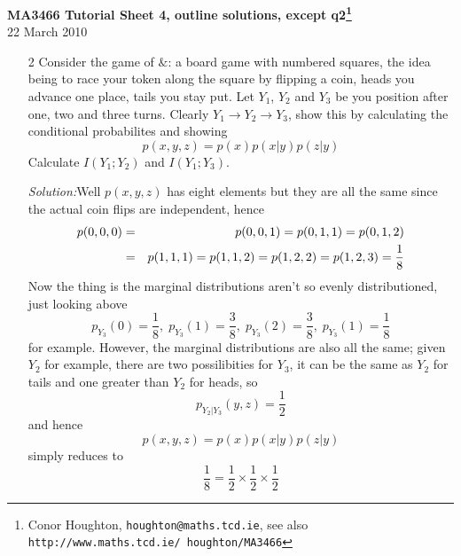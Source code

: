 \documentclass[12pt]{article}
\newcommand{\soln}{\noindent\textit{Solution:}}
\begin{document}
\begin{center}
{\bf MA3466 Tutorial Sheet 4, outline solutions, except q2\footnote{Conor Houghton, {\tt houghton@maths.tcd.ie}, see also {\tt http://www.maths.tcd.ie/ houghton/MA3466}}}\\[1cm]{} 22 March 2010
\end{center}
\begin{enumerate}

\item [2] Consider the game of $\&$\texttrademark: a board game with numbered squares, the idea being to race your token along the square by flipping a coin, heads you advance one place, tails you stay put. Let $Y_1$, $Y_2$ and $Y_3$ be you position after one, two and three turns. Clearly $Y_1\rightarrow Y_2 \rightarrow Y_3$, show this by calculating the conditional probabilites and showing
\begin{equation}
p(x,y,z)=p(x)p(x|y)p(z|y)
\end{equation}
Calculate $I(Y_1;Y_2)$ and $I(Y_1;Y_3)$.

\soln Well $p(x,y,z)$ has eight elements but they are all the same since the actual coin flips are independent, hence
\begin{eqnarray}
p(0,0,0)&=&p(0,0,1)=p(0,1,1)=p(0,1,2)\cr
&=&p(1,1,1)=p(1,1,2)=p(1,2,2)=p(1,2,3)=\frac{1}{8}
\end{eqnarray}
Now the thing is the marginal distributions aren't so evenly distributioned, just looking above
\begin{equation}
p_{Y_3}(0)=\frac{1}{8},\;
p_{Y_3}(1)=\frac{3}{8},\;
p_{Y_3}(2)=\frac{3}{8},\;
p_{Y_3}(1)=\frac{1}{8}
\end{equation}
for example. However, the marginal distributions are also all the same; given $Y_2$ for example, there are two possilibities for $Y_3$, it can be the same as $Y_2$ for tails and one greater than $Y_2$ for heads, so
\begin{equation}
p_{Y_2|Y_3}(y,z)=\frac{1}{2}
\end{equation}
and hence 
\begin{equation}
p(x,y,z)=p(x)p(x|y)p(z|y)
\end{equation}
simply reduces to
\begin{equation}
\frac{1}{8}=\frac{1}{2}\times \frac{1}{2}\times \frac{1}{2}
\end{equation}

\end{enumerate}
\end{document}
